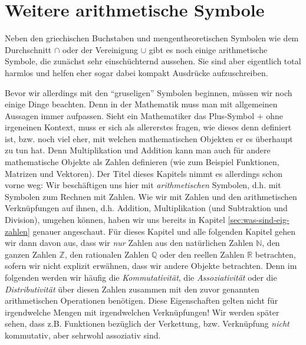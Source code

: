 \documentclass[11pt,reqno, a4paper]{book}
\theoremstyle{mystyle}
\theoremstyle{definition}
\numberwithin{equation}{chapter}
\begin{document}
\section{Weitere arithmetische Symbole}
Neben den griechischen Buchstaben und mengentheoretischen Symbolen wie dem Durchschnitt \(\cap\) oder der Vereinigung \(\cup\) gibt es noch einige arithmetische Symbole, die zunächst sehr einschüchternd aussehen. Sie sind aber eigentlich total harmlos und helfen eher sogar dabei kompakt Ausdrücke aufzuschreiben. 

Bevor wir allerdings mit den "`gruseligen"' Symbolen beginnen, müssen wir noch einige Dinge beachten. Denn in der Mathematik muss man mit allgemeinen Aussagen immer aufpassen. Sieht ein Mathematiker das Plus-Symbol \(+\) ohne irgeneinen Kontext, muss er sich als allererstes fragen, wie dieses denn definiert ist, bzw. noch viel eher, mit welchen mathematischen Objekten er es überhaupt zu tun hat. Denn Multiplikation und Addition kann man auch für andere mathematische Objekte als Zahlen definieren (wie zum Beispiel Funktionen, Matrizen und Vektoren). Der Titel dieses Kapitels nimmt es allerdings schon vorne weg: Wir beschäftigen uns hier mit \textit{arithmetischen} Symbolen, d.h. mit Symbolen zum Rechnen mit Zahlen. Wie wir mit Zahlen und den arithmetischen Verknüpfungen auf ihnen, d.h. Addition, Multiplikation (und Subtraktion und Division), umgehen können, haben wir uns bereits in Kapitel \ref{sec:was-sind-eig-zahlen} genauer angeschaut. Für dieses Kapitel und alle folgenden Kapitel gehen wir dann davon aus, dass wir \textit{nur} Zahlen aus den natürlichen Zahlen \(\mathbb N\), den ganzen Zahlen \(\mathbb Z\), den rationalen Zahlen \(\mathbb Q\) oder den reellen Zahlen \(\mathbb R\) betrachten, sofern wir nicht explizit erwähnen, dass wir andere Objekte betrachten. Denn im folgenden werden wir häufig die \textit{Kommutativität}, die \textit{Assoziativität} oder die \textit{Distributivität} über diesen Zahlen zusammen mit den zuvor genannten arithmetischen Operationen benötigen. Diese Eigenschaften gelten nicht für irgendwelche Mengen mit irgendwelchen Verknüpfungen! Wir werden später sehen, dass z.B. Funktionen bezüglich der Verkettung, bzw. Verknüpfung \textit{nicht} kommutativ, aber sehrwohl assoziativ sind. 
\end{document}
